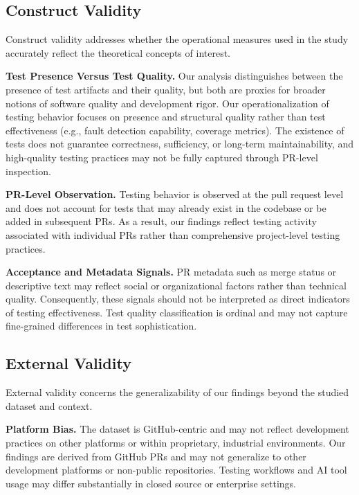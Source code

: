 \documentclass[conference]{IEEEtran}
\begin{document}
\subsection{Construct Validity}

Construct validity addresses whether the operational measures used in the study accurately reflect the theoretical concepts of interest.

\textbf{Test Presence Versus Test Quality.} Our analysis distinguishes between the presence of test artifacts and their quality, but both are proxies for broader notions of software quality and development rigor. Our operationalization of testing behavior focuses on presence and structural quality rather than test effectiveness (e.g., fault detection capability, coverage metrics). The existence of tests does not guarantee correctness, sufficiency, or long-term maintainability, and high-quality testing practices may not be fully captured through PR-level inspection.

\textbf{PR-Level Observation.} Testing behavior is observed at the pull request level and does not account for tests that may already exist in the codebase or be added in subsequent PRs. As a result, our findings reflect testing activity associated with individual PRs rather than comprehensive project-level testing practices.

\textbf{Acceptance and Metadata Signals.} PR metadata such as merge status or descriptive text may reflect social or organizational factors rather than technical quality. Consequently, these signals should not be interpreted as direct indicators of testing effectiveness. Test quality classification is ordinal and may not capture fine-grained differences in test sophistication.

\subsection{External Validity}

External validity concerns the generalizability of our findings beyond the studied dataset and context.

\textbf{Platform Bias.} The dataset is GitHub-centric and may not reflect development practices on other platforms or within proprietary, industrial environments. Our findings are derived from GitHub PRs and may not generalize to other development platforms or non-public repositories. Testing workflows and AI tool usage may differ substantially in closed source or enterprise settings.
\end{document}

